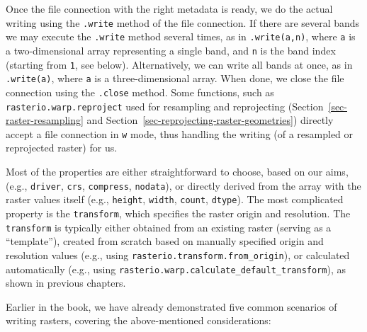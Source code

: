 \documentclass[
  letterpaper,
]{krantz}
\begin{document}
Once the file connection with the right metadata is ready, we do the
actual writing using the \texttt{.write} method of the file connection.
If there are several bands we may execute the \texttt{.write} method
several times, as in \texttt{.write(a,n)}, where \texttt{a} is a
two-dimensional array representing a single band, and \texttt{n} is the
band index (starting from \texttt{1}, see below). Alternatively, we can
write all bands at once, as in \texttt{.write(a)}, where \texttt{a} is a
three-dimensional array. When done, we close the file connection using
the \texttt{.close} method. Some functions, such as
\texttt{rasterio.warp.reproject} used for resampling and reprojecting
(Section~\ref{sec-raster-resampling} and
Section~\ref{sec-reprojecting-raster-geometries}) directly accept a file
connection in \texttt{\textquotesingle{}w\textquotesingle{}} mode, thus
handling the writing (of a resampled or reprojected raster) for us.

Most of the properties are either straightforward to choose, based on
our aims, (e.g., \texttt{driver}, \texttt{crs}, \texttt{compress},
\texttt{nodata}), or directly derived from the array with the raster
values itself (e.g., \texttt{height}, \texttt{width}, \texttt{count},
\texttt{dtype}). The most complicated property is the
\texttt{transform}, which specifies the raster origin and resolution.
The \texttt{transform} is typically either obtained from an existing
raster (serving as a ``template''), created from scratch based on
manually specified origin and resolution values (e.g., using
\texttt{rasterio.transform.from\_origin}), or calculated automatically
(e.g., using \texttt{rasterio.warp.calculate\_default\_transform}), as
shown in previous chapters.

Earlier in the book, we have already demonstrated five common scenarios
of writing rasters, covering the above-mentioned considerations:
\end{document}
